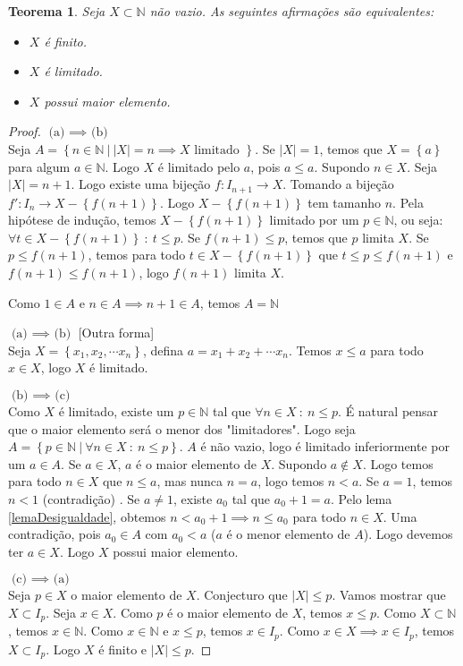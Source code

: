 \documentclass{article}
\theoremstyle{plain}
\newtheorem{teo}{Teorema}
\theoremstyle{definition}
\theoremstyle{remark}
\begin{document}
\begin{teo}
	Seja $X\subset \mathbb{N}$ não vazio. As seguintes afirmações são equivalentes:
	\begin{itemize}
		\item $X$ é finito.
		\item $X$ é limitado.
		\item $X$ possui maior elemento.
	\end{itemize}
\end{teo}
\begin{proof}
	$\text{(a) } \implies \text{ (b)}$ \\

	Seja $A = \left\{ n\in \mathbb{N} \: | \:  |X| = n \implies X \text{ limitado } \right\}$. Se $|X| = 1$, temos que $X =\left\{a\right\}$ para algum $a\in \mathbb{N}$. Logo $X$ é limitado pelo $a$, pois $a\leq a$. Supondo $n\in X$.  Seja $|X| = n+1$. Logo existe uma bijeção $f: I_{n+1} \to X$. Tomando a bijeção $f':I_n \to X-\left\{f(n+1)\right\}$. Logo $X-\left\{f(n+1)\right\}$ tem tamanho $n$. Pela hipótese de indução, temos $X - \left\{ f(n+1)\right\}$ limitado por um $p \in \mathbb{N}$, ou seja: $\forall t\in X - \left\{f(n+1) \right\} \: : \: t\leq p $. Se $f(n+1) \leq p$, temos que $p$ limita $X$. Se $p\leq f(n+1)$, temos para todo $t\in X - \left\{ f(n+1) \right\}$ que $t\leq p \leq f(n+1)$ e $f(n+1)\leq f(n+1)$, logo $f(n+1)$ limita $X$.

	Como $1\in A$ e $n \in A \implies n+1\in A$, temos $A = \mathbb{N}$


	$\text{(a) } \implies \text{ (b)}$ [Outra forma] \\
	Seja $X = \left\{x_1,x_2,\cdots x_n \right\}$, defina $a = x_1+x_2+\cdots x_n$. Temos $x\leq a $ para todo $x\in X$, logo $X$ é limitado.
	

	$\text{(b) } \implies \text{ (c)}$ \\

	Como $X$ é limitado, existe um $p\in \mathbb{N}$ tal que $\forall n \in X \: : \: n \leq p$. É natural pensar que o maior elemento será o menor dos "limitadores". Logo seja $A = \left\{ p \in \mathbb{N} \: | \: \forall n \in X \: : \: n\leq p \right\}$. $A$ é não vazio, logo é limitado inferiormente por um $a\in A$. Se $a\in X$, $a$ é o maior elemento de $X$.  Supondo $a\not \in X$. Logo temos para todo $n\in X$ que  $n \leq a$, mas nunca  $n = a$, logo temos $n < a$. Se $a = 1$, temos $n<1$ (contradição) . Se $a \neq 1$, existe $a_0$ tal que $a_0 + 1 = a$. Pelo lema \ref{lemaDesigualdade}, obtemos $n < a_0+1 \implies n \leq a_0$ para todo $n\in X$. Uma contradição, pois $a_0\in A$ com $a_0 < a$ ($a$ é o menor elemento de $A$).  Logo devemos ter $a\in X$. Logo $X$ possui maior elemento.

	$\text{(c) } \implies \text{ (a)}$ \\

	Seja $p\in X$ o maior elemento de $X$. Conjecturo que $|X| \leq p$.  Vamos mostrar que $X \subset I_p$.  Seja $x\in X$. Como $p$ é o maior elemento de $X$, temos $x\leq p$. Como $X\subset \mathbb{N}$, temos $x\in \mathbb{N}$. Como $x\in \mathbb{N}$ e $x\leq p$, temos $x\in I_p$. Como $x\in X\implies x\in I_p$, temos $X\subset I_p$. Logo $X$ é finito e $|X| \leq  p$.
\end{proof}
\end{document}
